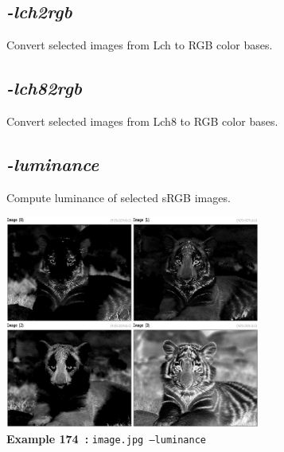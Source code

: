 \documentclass[a4paper,11pt,twoside]{book}
\begin{document}
\subsection{\emph{-lch2rgb} }\vspace*{-0.5em}
Convert selected images from Lch to RGB color bases.


\subsection{\emph{-lch82rgb} }\vspace*{-0.5em}
Convert selected images from Lch8 to RGB color bases.


\subsection{\emph{-luminance} }\vspace*{-0.5em}
Compute luminance of selected sRGB images.
\begin{center}\includegraphics[keepaspectratio=true,height=7cm,width=\textwidth]{img/gmic_def174.jpg}\\
{\footnotesize \textbf{Example 174~:} \texttt{image.jpg --luminance}}
\end{center}
\end{document}

